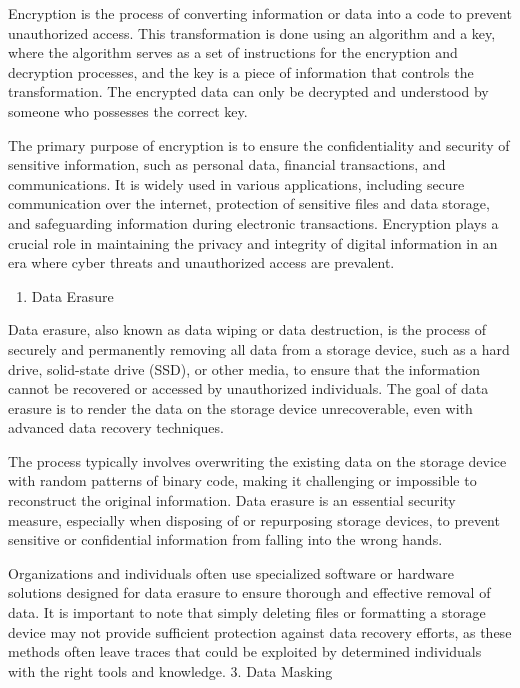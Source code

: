 \documentclass[
  letterpaper,
  DIV=11,
  numbers=noendperiod]{scrreprt}
\providecommand{\tightlist}{%
  \setlength{\itemsep}{0pt}\setlength{\parskip}{0pt}}\usepackage{longtable,booktabs,array}
\begin{document}
Encryption is the process of converting information or data into a code
to prevent unauthorized access. This transformation is done using an
algorithm and a key, where the algorithm serves as a set of instructions
for the encryption and decryption processes, and the key is a piece of
information that controls the transformation. The encrypted data can
only be decrypted and understood by someone who possesses the correct
key.

The primary purpose of encryption is to ensure the confidentiality and
security of sensitive information, such as personal data, financial
transactions, and communications. It is widely used in various
applications, including secure communication over the internet,
protection of sensitive files and data storage, and safeguarding
information during electronic transactions. Encryption plays a crucial
role in maintaining the privacy and integrity of digital information in
an era where cyber threats and unauthorized access are prevalent.

\begin{enumerate}
\def\labelenumi{\arabic{enumi}.}
\setcounter{enumi}{1}
\tightlist
\item
  Data Erasure
\end{enumerate}

Data erasure, also known as data wiping or data destruction, is the
process of securely and permanently removing all data from a storage
device, such as a hard drive, solid-state drive (SSD), or other media,
to ensure that the information cannot be recovered or accessed by
unauthorized individuals. The goal of data erasure is to render the data
on the storage device unrecoverable, even with advanced data recovery
techniques.

The process typically involves overwriting the existing data on the
storage device with random patterns of binary code, making it
challenging or impossible to reconstruct the original information. Data
erasure is an essential security measure, especially when disposing of
or repurposing storage devices, to prevent sensitive or confidential
information from falling into the wrong hands.

Organizations and individuals often use specialized software or hardware
solutions designed for data erasure to ensure thorough and effective
removal of data. It is important to note that simply deleting files or
formatting a storage device may not provide sufficient protection
against data recovery efforts, as these methods often leave traces that
could be exploited by determined individuals with the right tools and
knowledge. 3. Data Masking
\end{document}
